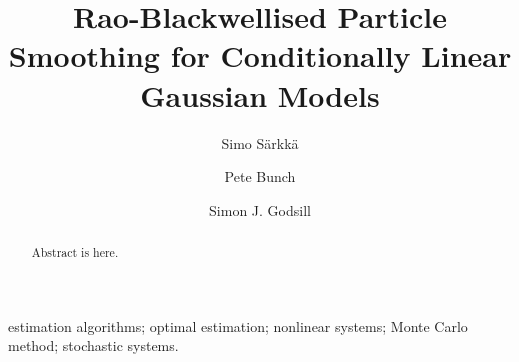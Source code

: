 \documentclass[twocolumn]{autart}    %
\begin{document}
\begin{frontmatter}







\title{Rao-Blackwellised Particle Smoothing for
Conditionally Linear Gaussian Models}


\author[First]{Simo S\"arkk\"a}
\author[Second]{Pete Bunch}
\author[Third]{Simon J. Godsill}

\address[First]{Aalto University, P.O. Box
  12200. FI-00076 AALTO, Finland. (Tel: +358 50 512 4393; e-mail: simo.sarkka@aalto.fi)}
\address[Second]{University of Cambridge, Department of Engineering, Trumpington Street, Cambridge CB2 1PZ, UK (e-mail: pb404@cam.ac.uk)}
\address[Third]{University of Cambridge, Department of Engineering, Trumpington Street, Cambridge CB2 1PZ, UK (e-mail: sjg@cam.ac.uk)}


\begin{keyword}
estimation algorithms; optimal estimation; nonlinear systems;
Monte Carlo method; stochastic systems.
\end{keyword}

\begin{abstract}  %
Abstract is here.
\end{abstract}

\end{frontmatter}
\end{document}
